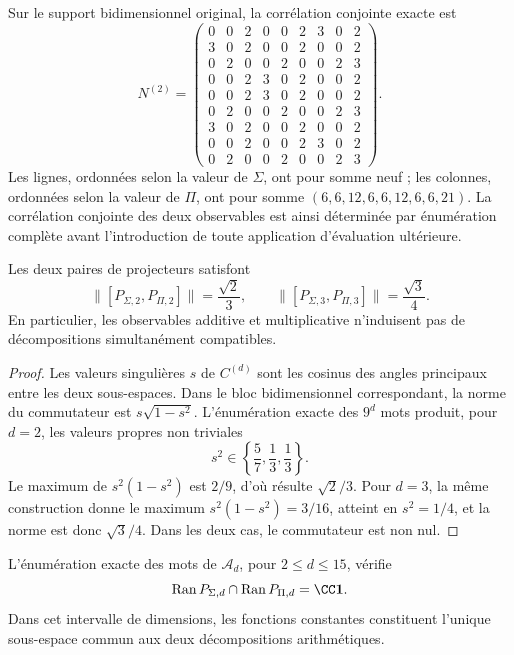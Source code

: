 Sur le support bidimensionnel original, la corrélation conjointe exacte est
\[
N^{(2)}=
\begin{pmatrix}
0&0&2&0&0&2&3&0&2\\
3&0&2&0&0&2&0&0&2\\
0&2&0&0&2&0&0&2&3\\
0&0&2&3&0&2&0&0&2\\
0&0&2&3&0&2&0&0&2\\
0&2&0&0&2&0&0&2&3\\
3&0&2&0&0&2&0&0&2\\
0&0&2&0&0&2&3&0&2\\
0&2&0&0&2&0&0&2&3
\end{pmatrix}.
\]
Les lignes, ordonnées selon la valeur de \(\Sigma\), ont pour somme neuf ; les colonnes,
ordonnées selon la valeur de \(\Pi\), ont pour somme
\((6,6,12,6,6,12,6,6,21)\). La corrélation conjointe des deux observables est ainsi déterminée par énumération complète
avant l'introduction de toute
application d'évaluation ultérieure.

\begin{proposition}
\label{prop:app-no-conmutatividad}
Les deux paires de projecteurs satisfont
\[
 \|[P_{\Sigma,2},P_{\Pi,2}]\|=\frac{\sqrt2}{3},
 \qquad
 \|[P_{\Sigma,3},P_{\Pi,3}]\|=\frac{\sqrt3}{4}.
\]
En particulier, les observables additive et multiplicative n'induisent pas de
décompositions simultanément compatibles.
\end{proposition}

\begin{proof}
Les valeurs singulières \(s\) de \(C^{(d)}\) sont les cosinus des angles
principaux entre les deux sous-espaces. Dans le bloc bidimensionnel
correspondant, la norme du commutateur est \(s\sqrt{1-s^2}\). L'énumération
exacte des \(9^d\) mots produit, pour \(d=2\), les valeurs propres non
triviales
\[
 s^2\in\left\{\frac57,\frac13,\frac13\right\}.
\]
Le maximum de \(s^2(1-s^2)\) est \(2/9\), d'où résulte
\(\sqrt2/3\). Pour \(d=3\), la même construction donne le maximum
\(s^2(1-s^2)=3/16\), atteint en \(s^2=1/4\), et la norme est donc
\(\sqrt3/4\). Dans les deux cas, le commutateur est non nul.
\end{proof}

\begin{proposition}
\label{prop:app-interseccion-proyectores}
L'énumération exacte des mots de \(\mathscr A_d\), pour
\(2\leq d\leq15\), vérifie
\[
 \operatorname{Ran}P_{\Sigma,d}\cap
 \operatorname{Ran}P_{\Pi,d}
 =\CC\mathbf 1.
\]
Dans cet intervalle de dimensions, les fonctions constantes constituent
l'unique sous-espace commun aux deux décompositions arithmétiques.
\end{proposition}

